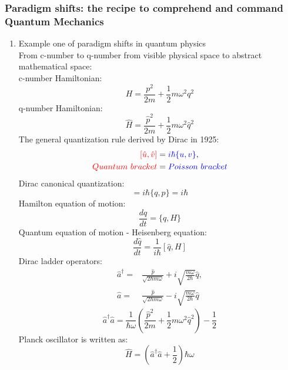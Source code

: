 \documentclass[12pt]{article}
\numberwithin{equation}{section}
\begin{document}
\subsubsection{Paradigm shifts: the recipe to comprehend and command Quantum Mechanics}
\begin{enumerate}
\item Example one of paradigm shifts in quantum physics\\
     	From c-number to q-number from visible physical space to abstract mathematical space: \\
	{\color{blue} c-number Hamiltonian:
    	\[H=\frac{p^2}{2m}+\frac{1}{2}m\omega^2q^2\]}
	{\color{red} q-number Hamiltonian:
	\[\hat{H}=\frac{\hat{p}^2}{2m}+\frac{1}{2}m\omega^2\hat{q}^2\]}
	The general quantization rule derived by Dirac in 1925:
	\begin{equation}\begin{split}
	{\color{red}[\hat{u},\hat{v}]}&={\color{blue}i\hbar \{u, v\}}, \\
	{\color{red}Quantum\ bracket} &= {\color{blue}Poisson\ bracket}
	\end{split}\end{equation}
	Dirac canonical quantization:
	\begin{equation}[\hat{q},\hat{p}]=i\hbar \{q, p\}=i\hbar\end{equation}
	{\color{blue} Hamilton equation of motion:
	\begin{equation}\frac{dq}{dt}=\{q, H\}\end{equation}}
	{\color{red} Quantum equation of motion - Heisenberg equation:
	\begin{equation}\frac{d\hat{q}}{dt}=\frac{1}{i\hbar}[\hat{q}, H]\end{equation}}
	Dirac ladder operators:
	\begin{equation}\begin{split}
	\hat{a}^\dag=&\frac{\hat{p}}{\sqrt{2\hbar m\omega}}+i\sqrt{\frac{m\omega}{2\hbar}}\hat{q},\\
	\hat{a}=&\frac{\hat{p}}{\sqrt{2\hbar m\omega}}-i\sqrt{\frac{m\omega}{2\hbar}}\hat{q}
	\end{split}\end{equation}
	\begin{equation}\hat{a}^\dag\hat{a}=\frac{1}{\hbar\omega}(\frac{\hat{p}^2}{2m}+\frac{1}{2}m\omega^2\hat{q}^2)-\frac{1}{2}\end{equation}
	Planck oscillator is written as:
	\begin{equation}\hat{H}=(\hat{a}^\dag\hat{a}+\frac{1}{2})\hbar\omega\end{equation}

\end{enumerate}
\end{document}
